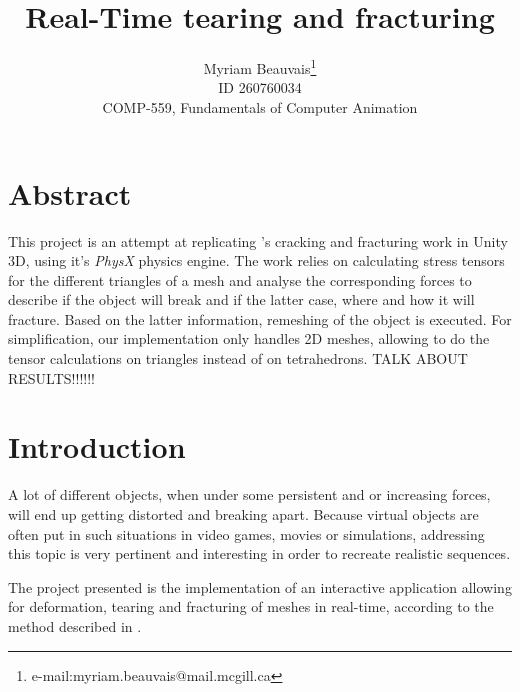 \documentclass[tog]{acmsiggraph}
\title{Real-Time tearing and fracturing}
\author{Myriam Beauvais\thanks{e-mail:myriam.beauvais@mail.mcgill.ca} \\ ID 260760034 \\COMP-559, Fundamentals of Computer Animation}
\begin{document}



\maketitle

\copyrightspace

\section{Abstract}
This project is an attempt at replicating \cite{Obrien:1999:GMA}'s cracking and fracturing work in Unity 3D, using it's \textit{PhysX} physics engine. The work relies on calculating stress tensors for the different triangles of a mesh and analyse the corresponding forces to describe if the object will break and if the latter case, where and how it will fracture. Based on the latter information, remeshing of the object is executed. For simplification, our implementation only handles 2D meshes, allowing to do the tensor calculations on triangles instead of on tetrahedrons. TALK ABOUT RESULTS!!!!!!

\section{Introduction}
A lot of different objects, when under some persistent and or increasing forces, will end up getting distorted and breaking apart. Because virtual objects are often put in such situations in video games, movies or simulations, addressing this topic is very pertinent and interesting in order to recreate realistic sequences.  

The project presented is the implementation of an interactive application allowing for deformation, tearing and fracturing of meshes in real-time, according to the method described in \cite{Obrien:1999:GMA}. 
\end{document}
